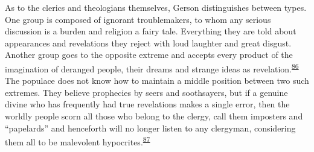 As to the clerics and theologians themselves, Gerson distinguishes
between types. One group is composed of ignorant troublemakers, to whom
any serious discussion is a burden and religion a fairy tale. Everything
they are told about appearances and revelations they reject with loud
laughter and great disgust. Another group goes to the opposite extreme
and accepts every product of the imagination of deranged people, their
dreams and strange ideas as
revelation.\textsuperscript{\protect\hypertarget{13_Chapter_Six__THE_DEPICTION_OF_TH.xhtmlux5cux23id_1100}{\protect\hyperlink{23_NOTES.xhtmlux5cux23id_1101}{86}}}
The populace does not know how to maintain a middle position between two
such extremes. They believe prophecies by seers and soothsayers, but if
a genuine divine who has frequently had true revelations makes a single
error, then the worldly people scorn all those who belong to the clergy,
call them imposters and ``papelards'' and henceforth will no longer
listen to any clergyman, considering them all to be malevolent
hypocrites.\textsuperscript{\protect\hypertarget{13_Chapter_Six__THE_DEPICTION_OF_TH.xhtmlux5cux23id_1098}{\protect\hyperlink{23_NOTES.xhtmlux5cux23id_1099}{87}}}

